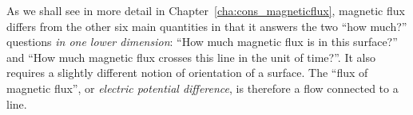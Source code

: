 \documentclass[a4paper,12pt,%
onecolumn,oneside,%
british%
]{memoir}
\renewcommand*{\|}[1][]{\nonscript\:#1\vert\nonscript\:\mathopen{}}
\newcommand*{\chap}{Chapter}%
\begin{document}
As we shall see in more detail in \chap~\ref{cha:cons_magneticflux}, magnetic flux differs from the other six main quantities in that it answers the two \enquote{how much?} questions \emph{in one lower dimension}: \enquote{How much magnetic flux is in this surface?} and \enquote{How much magnetic flux crosses this line in the unit of time?}. It also requires a slightly different notion of orientation of a surface. The \enquote{flux of magnetic flux}, or \emph{electric potential difference}, is therefore a flow connected to a line.


\end{document}

